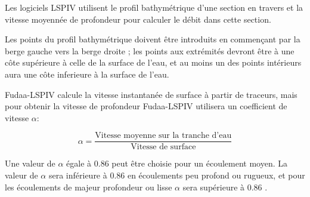 \documentclass[
]{article}
\begin{document}
Les logiciels LSPIV utilisent le profil bathymétrique d'une section en travers et la vitesse moyennée de profondeur pour calculer le débit dans cette section.

Les points du profil bathymétrique doivent être introduits en commençant par la berge gauche vers la berge droite ; les points aux extrémités devront être à une côte supérieure à celle de la surface de l'eau, et au moins un des points intérieurs aura une côte inferieure à la surface de l'eau.

Fudaa-LSPIV calcule la vitesse instantanée de surface à partir de traceurs, mais pour obtenir la vitesse de profondeur Fudaa-LSPIV utilisera un coefficient de vitesse \(\alpha\):

\begin{equation}
\alpha =  \frac{\text{Vitesse moyenne sur la tranche d'eau}}{\text{Vitesse de surface}}
\end{equation}

Une valeur de \(\alpha\) égale à 0.86 peut être choisie pour un écoulement moyen. La valeur de \(\alpha\) sera inférieure à 0.86 en écoulements peu profond ou rugueux, et pour les écoulements de majeur profondeur ou lisse \(\alpha\) sera supérieure à 0.86 \citep{hauet_application_2013} .

\newpage

  
\end{document}
